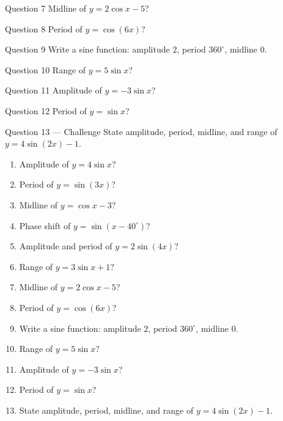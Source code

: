 \documentclass[11pt]{article}
\begin{document}
\begin{qbox}{Question 7}
Midline of $y=2\cos x-5$?\workspace{2.4cm}
\end{qbox}

\begin{qbox}{Question 8}
Period of $y=\cos(6x)$?\workspace{2.4cm}
\end{qbox}

\begin{qbox}{Question 9}
Write a sine function: amplitude $2$, period $360^\circ$, midline $0$.\workspace{2.4cm}
\end{qbox}

\begin{qbox}{Question 10}
Range of $y=5\sin x$?\workspace{2.4cm}
\end{qbox}

\begin{qbox}{Question 11}
Amplitude of $y=-3\sin x$?\workspace{2.4cm}
\end{qbox}

\begin{qbox}{Question 12}
Period of $y=\sin x$?\workspace{2.4cm}
\end{qbox}

\begin{qbox}{Question 13 --- Challenge}
State amplitude, period, midline, and range of $y=4\sin(2x)-1$.\workspace{3.5cm}
\end{qbox}

\clearpage
{}

\begin{recapbox}
\begin{multicols}{2}
\small
\begin{enumerate}[leftmargin=*,itemsep=3pt]
  \item Amplitude of $y=4\sin x$?
  \item Period of $y=\sin(3x)$?
  \item Midline of $y=\cos x-3$?
  \item Phase shift of $y=\sin(x-40^\circ)$?
  \item Amplitude and period of $y=2\sin(4x)$?
  \item Range of $y=3\sin x+1$?
  \item Midline of $y=2\cos x-5$?
  \item Period of $y=\cos(6x)$?
  \item Write a sine function: amplitude $2$, period $360^\circ$, midline $0$.
  \item Range of $y=5\sin x$?
  \item Amplitude of $y=-3\sin x$?
  \item Period of $y=\sin x$?
  \item State amplitude, period, midline, and range of $y=4\sin(2x)-1$.
\end{enumerate}
\end{multicols}
\end{recapbox}
\end{document}
